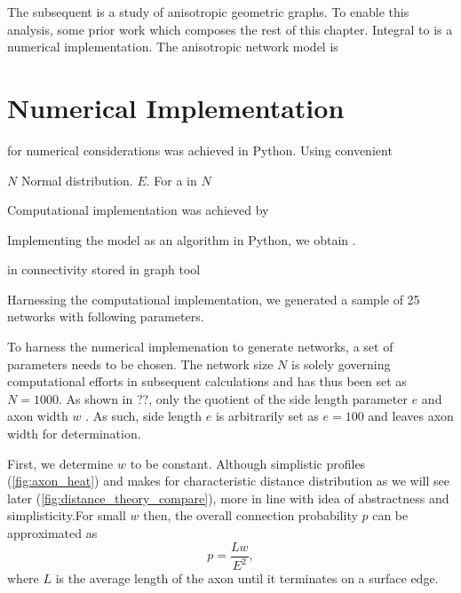 
The subsequent is a study of anisotropic geometric graphs. To enable
this analysis, some prior work which composes the rest of this
chapter. Integral to is a numerical implementation. The anisotropic
network model is 





\section{Numerical Implementation}\label{numerical_implementation}

for numerical considerations was achieved in Python. Using convenient 



$N$ Normal distribution. $E$. For a in $N$ 

Computational implementation was achieved by 




Implementing the model as an algorithm in Python, we obtain .

 in connectivity stored in graph
tool \parencite{graph_tool} %

Harnessing the computational implementation, we generated a sample of
25 networks with following parameters. 



To harness the numerical implemenation to generate networks, a set
of parameters needs to be chosen. The network size $N$ is solely
governing computational efforts in subsequent calculations and has
thus been set as $N = 1000$. As shown in ??, only the quotient of
the side length parameter $e$ and axon width $w$  . As such, side
length $e$ is arbitrarily set as $e = 100$ and leaves axon width for
determination. 

First, we determine $w$ to be constant. Although simplistic profiles
(\autoref{fig:axon_heat}) and makes for characteristic distance
distribution as we will see later
(\autoref{fig:distance_theory_compare}), more in line with idea of
abstractness and simplisticity.For small $w$ then, the overall
connection probability $p$ can be approximated as
\[
p = \frac{L w}{E^2},
\]
where $L$ is the average length of the axon until it terminates on a
surface edge. 

